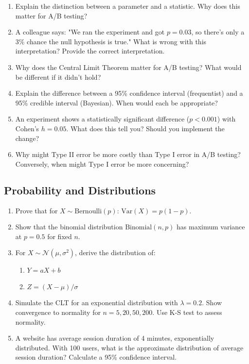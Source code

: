 \begin{enumerate}
    \item Explain the distinction between a parameter and a statistic. Why does this matter for A/B testing?

    \item A colleague says: "We ran the experiment and got $p = 0.03$, so there's only a 3\% chance the null hypothesis is true." What is wrong with this interpretation? Provide the correct interpretation.

    \item Why does the Central Limit Theorem matter for A/B testing? What would be different if it didn't hold?

    \item Explain the difference between a 95\% confidence interval (frequentist) and a 95\% credible interval (Bayesian). When would each be appropriate?

    \item An experiment shows a statistically significant difference ($p < 0.001$) with Cohen's $h = 0.05$. What does this tell you? Should you implement the change?

    \item Why might Type II error be more costly than Type I error in A/B testing? Conversely, when might Type I error be more concerning?
\end{enumerate}

\subsection{Probability and Distributions}

\begin{enumerate}
    \item Prove that for $X \sim \text{Bernoulli}(p)$: $\text{Var}(X) = p(1-p)$.

    \item Show that the binomial distribution $\text{Binomial}(n, p)$ has maximum variance at $p = 0.5$ for fixed $n$.

    \item For $X \sim \mathcal{N}(\mu, \sigma^2)$, derive the distribution of:
    \begin{enumerate}
        \item $Y = aX + b$
        \item $Z = (X - \mu)/\sigma$
    \end{enumerate}

    \item Simulate the CLT for an exponential distribution with $\lambda = 0.2$. Show convergence to normality for $n = 5, 20, 50, 200$. Use K-S test to assess normality.

    \item A website has average session duration of 4 minutes, exponentially distributed. With 100 users, what is the approximate distribution of average session duration? Calculate a 95\% confidence interval.
\end{enumerate}

